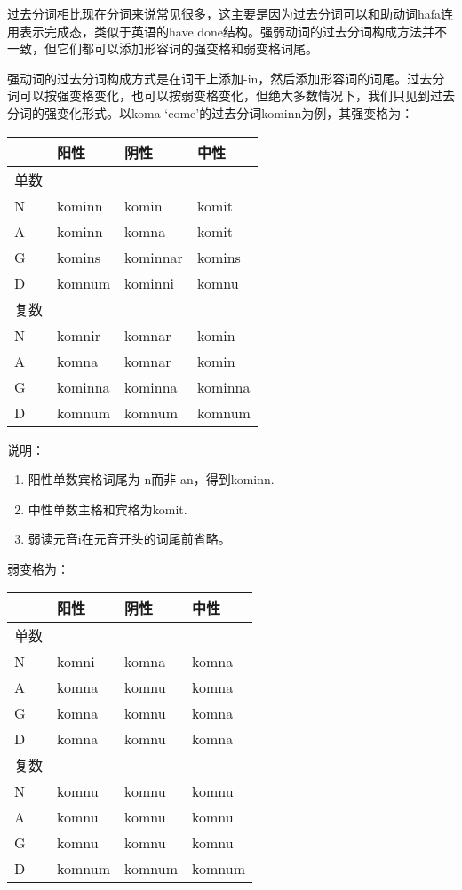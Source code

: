 过去分词相比现在分词来说常见很多，这主要是因为过去分词可以和助动词hafa连用表示完成态，类似于英语的have
done结构。强弱动词的过去分词构成方法并不一致，但它们都可以添加形容词的强变格和弱变格词尾。

强动词的过去分词构成方式是在词干上添加-in，然后添加形容词的词尾。过去分词可以按强变格变化，也可以按弱变格变化，但绝大多数情况下，我们只见到过去分词的强变化形式。以koma
`come‌'的过去分词kominn为例，其强变格为：

\begin{longtable}{llll}
  \toprule
       & 阳性    & 阴性     & 中性    \\
  \midrule
  \endhead
  \bottomrule
  \endfoot
  单数 &         &          &         \\
  N    & kominn  & komin    & komit   \\
  A    & kominn  & komna    & komit   \\
  G    & komins  & kominnar & komins  \\
  D    & komnum  & kominni  & komnu   \\
  复数 &         &          &         \\
  N    & komnir  & komnar   & komin   \\
  A    & komna   & komnar   & komin   \\
  G    & kominna & kominna  & kominna \\
  D    & komnum  & komnum   & komnum  \\
\end{longtable}

说明：

\begin{enumerate}
  \def\labelenumi{\arabic{enumi})}
  \item
        阳性单数宾格词尾为-n而非-an，得到kominn.
  \item
        中性单数主格和宾格为komit.
  \item
        弱读元音i在元音开头的词尾前省略。
\end{enumerate}

弱变格为：

\begin{longtable}{llll}
  \toprule
       & 阳性   & 阴性   & 中性   \\
  \midrule
  \endhead
  \bottomrule
  \endfoot
  单数 &        &        &        \\
  N    & komni  & komna  & komna  \\
  A    & komna  & komnu  & komna  \\
  G    & komna  & komnu  & komna  \\
  D    & komna  & komnu  & komna  \\
  复数 &        &        &        \\
  N    & komnu  & komnu  & komnu  \\
  A    & komnu  & komnu  & komnu  \\
  G    & komnu  & komnu  & komnu  \\
  D    & komnum & komnum & komnum \\
\end{longtable}

